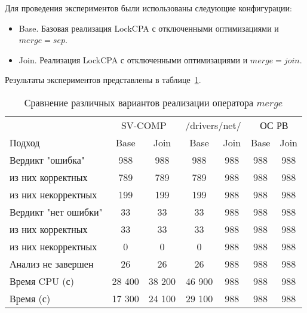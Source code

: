 Для проведения экспериментов были использованы следующие конфигурации:

\begin{itemize}
\item Base. Базовая реализация LockCPA с отключенными оптимизациями и $merge = sep$.
\item Join. Реализация LockCPA с отключенными оптимизациями и $merge = join$.
\end{itemize}

Результаты экспериментов представлены в таблице~\ref{table-drivers-lock-merge}.

\begin{center}
  \begin{table}[h]\footnotesize
  	\label{table-drivers-lock-merge}
    \caption{Сравнение различных вариантов реализации оператора $merge$}
    \begin{tabular}{ | l | c | c | c | c | c | c |}
      \hline
      		& 		\multicolumn{2}{|c|}{SV-COMP} & \multicolumn{2}{|c|}{/drivers/net/} & \multicolumn{2}{|c|}{ОС РВ} \\
      Подход         				& Base 	& Join 	& Base 	& Join 	& Base 	& Join  	\\ \hline
      Вердикт "ошибка" 				& 988   & 988   & 988   & 988   & 988   & 988   	\\ 
  \hspace{0.5cm} из них корректных 	& 789 	& 789 	& 789   & 988   & 988   & 988   	\\ 
  \hspace{0.5cm} из них некорректных & 199 	& 199 	& 199   & 988   & 988   & 988     	\\ \hline
      Вердикт "нет ошибки"  		& 33    & 33    & 33    & 988   & 988  	& 988     	\\ 
  \hspace{0.5cm} из них корректных 	& 33 	& 33    & 33    & 988   & 988   & 988   	\\
  \hspace{0.5cm} из них некорректных & 0 	& 0    	& 0     & 988   & 988   & 988   	\\ \hline
      Анализ не завершен       		& 26    & 26    & 26    & 988   & 988   & 988    	\\ \hline
      Время CPU (с)   				& 28 400 & 38 200 & 46 900 & 988 & 988  & 988   	\\ 
      Время (с)  					& 17 300 & 24 100 & 29 100 & 988 & 988 	& 988    	\\
      \hline
    \end{tabular}
  \end{table}
\end{center}

